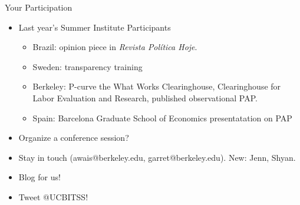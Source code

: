 \documentclass{beamer}
\begin{document}
\begin{frame}{Your Participation}
\begin{itemize}
\item Last year's Summer Institute Participants
\begin{itemize}
\item Brazil: opinion piece in \textit{Revista Política Hoje}.  \href{http://bitss.org/2014/11/19/replication-brazil/}{}
\item Sweden: transparency training \href{http://bitss.org/2014/10/28/swedish-graduate-student-training/}{}
\item Berkeley: P-curve the What Works Clearinghouse, Clearinghouse for Labor Evaluation and Research, published observational PAP. \href{http://obsstudies.org/journal.php?id=17}{}
\item Spain: Barcelona Graduate School of Economics presentatation on PAP
\end{itemize}
\item Organize a conference session?
\item Stay in touch (awais@berkeley.edu, garret@berkeley.edu). New: Jenn, Shyan.
\item Blog for us!
\item Tweet @UCBITSS!
\end{itemize}
\end{frame}
\end{document}
